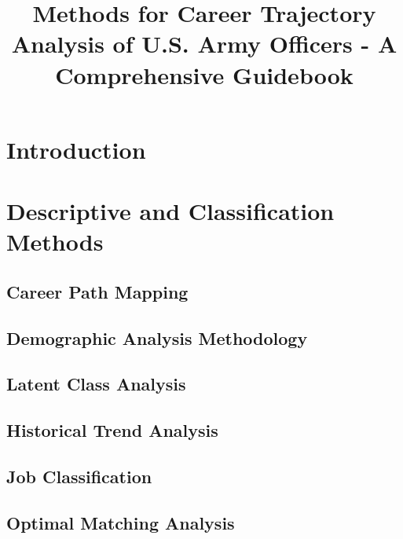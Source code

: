 \documentclass[12pt,a4paper]{article}
\title{Methods for Career Trajectory Analysis of U.S. Army Officers - A Comprehensive Guidebook}
\author{}
\date{}
\begin{document}
\maketitle

\tableofcontents

\newpage
\section{Introduction}


\newpage
\section{Descriptive and Classification Methods}


\subsection{Career Path Mapping}


\subsection{Demographic Analysis Methodology}


\subsection{Latent Class Analysis}


\subsection{Historical Trend Analysis}


\subsection{Job Classification}


\subsection{Optimal Matching Analysis}

\end{document}
